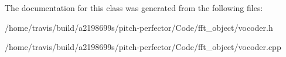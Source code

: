 The documentation for this class was generated from the following files\-:\begin{DoxyCompactItemize}
\item 
/home/travis/build/a2198699s/pitch-\/perfector/\-Code/fft\-\_\-object/vocoder.\-h\item 
/home/travis/build/a2198699s/pitch-\/perfector/\-Code/fft\-\_\-object/vocoder.\-cpp\end{DoxyCompactItemize}
